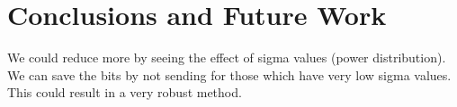 \documentclass[conference]{IEEEtran}
\begin{document}
\section{Conclusions and Future Work}
\label{section4}

We could reduce more by seeing the effect of sigma values (power distribution). We can save the bits by not sending for those which have very low sigma values. This could result in a very robust method.

\vspace{-4pt}














\renewcommand{\bibfont}{\footnotesize}




\end{document}
